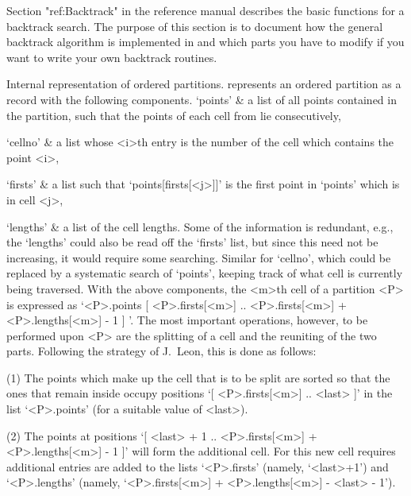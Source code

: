 
\begingroup%
\def\calR{{\cal R}} \def\I{{\cal I}}%

Section "ref:Backtrack" in the reference manual describes the basic
functions for a backtrack search. The purpose of
this section  is  to document  how  the general   backtrack algorithm  is
implemented in {\GAP} and which  parts you have to modify  if you want to
write your own backtrack routines.

\medskip
{}
{\bsf Internal   representation  of  ordered   partitions.}\quad   {\GAP}
represents  an  ordered  partition  as  a  record  with   the   following
components.
\beginitems
`points' &
        a list  of all points contained in  the  partition, such that the
        points of each cell from lie consecutively,

`cellno' &
        a list whose <i>th entry is the number of the cell which contains
        the point <i>,

`firsts' &
        a list  such that  `points[firsts[<j>]]'  is  the first point  in
        `points' which is in cell <j>,

`lengths' &
        a list of the  cell lengths.
\enditems
Some of the information is  redundant, e.g., the  `lengths' could also be
read off the `firsts' list,  but since this   need not be increasing,  it
would    require some searching. Similar  for    `cellno', which could be
replaced by a systematic search  of `points', keeping  track of what cell
is currently being  traversed. With the above  components, the <m>th cell
of   a partition <P> is   expressed as `<P>.points{  [ <P>.firsts[<m>] ..
<P>.firsts[<m>] +  <P>.lengths[<m>]  -  1  ]   }'. The   most   important
operations, however, to be performed upon <P> are the splitting of a cell
and the reuniting  of the two parts. Following  the strategy  of J.~Leon,
this is done as follows:

\beginlist%

\item{(1)}
The points which make up the cell that is to be split are sorted so  that
the ones that remain inside occupy positions `[ <P>.firsts[<m>] .. <last>
]' in the list `<P>.points' (for a suitable value of <last>).

\item{(2)}
The  points  at  positions  `[  <last>   +   1   ..   <P>.firsts[<m>]   +
<P>.lengths[<m>] - 1 ]' will form the additional cell. For this new  cell
requires additional entries are added to the lists `<P>.firsts'  (namely,
`<last>+1')    and    `<P>.lengths'    (namely,    `<P>.firsts[<m>]     +
<P>.lengths[<m>] - <last> - 1').

